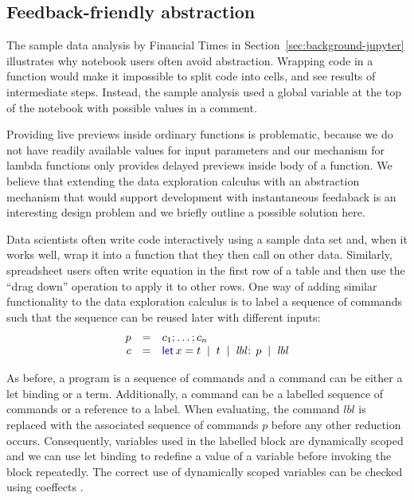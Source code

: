 \documentclass[acmsmall,anonymous,fleqn]{acmart}\settopmatter{printfolios=false,printccs=false,printacmref=false}
\theoremstyle{plain}
\theoremstyle{definition}
\newcommand{\lsep}{\;\;|\;\;}
\newcommand{\kvd}[1]{\textnormal{\textcolor{kvdclr}{\sffamily #1}}}
\begin{document}

\subsection{Feedback-friendly abstraction}
\label{sec:extra-abstraction}

The sample data analysis by Financial Times in Section~\ref{sec:background-jupyter} illustrates why
notebook users often avoid abstraction. Wrapping code in a function would make it impossible to
split code into cells, and see results of intermediate steps. Instead, the sample analysis used a
global variable at the top of the notebook with possible values in a comment.

Providing live previews inside ordinary functions is problematic, because we do not have readily
available values for input parameters and our mechanism for lambda functions only provides
delayed previews inside body of a function. We believe that extending the data exploration calculus
with an abstraction mechanism that would support development with instantaneous feedaback is an
interesting design problem and we briefly outline a possible solution here.

Data scientists often write code interactively using a sample data set and, when it works well,
wrap it into a function that they then call on other data. Similarly, spreadsheet users
often write equation in the first row of a table and then use the ``drag down'' operation to
apply it to other rows. One way of adding similar functionality to the data exploration calculus
is to label a sequence of commands such that the sequence can be reused later with different
inputs:
%
\begin{equation*}
\begin{array}{rcl}
p &=& c_1; \ldots; c_n\\
c &=& \kvd{let}\,x=t \lsep t \lsep \textit{lbl}\!:\,p \lsep \textit{lbl}
\end{array}
\end{equation*}

\noindent
As before, a program is a sequence of commands and a command can be either a let binding or a term.
Additionally, a command can be a labelled sequence of commands or a reference to a label. When
evaluating, the command $\textit{lbl}$ is replaced with the associated sequence of commands $p$
before any other reduction occurs. Consequently, variables used in the labelled block are
dynamically scoped and we can use let binding to redefine a value of a variable before invoking
the block repeatedly. The correct use of dynamically scoped variables can be checked using
coeffects \cite{coeffects}.
\end{document}
